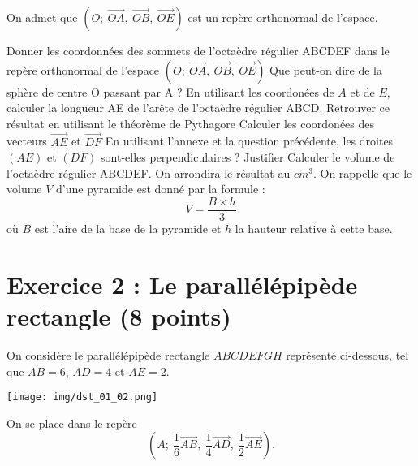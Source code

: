 \documentclass{exam}
\begin{document}
On admet que $\left(O\mathpunct{} ; \ \overrightarrow{OA}\mathpunct{}, \ \overrightarrow{OB}\mathpunct{}, \ \overrightarrow{OE}\right)$ est un repère orthonormal de l'espace.
\begin{questions}
  \question[2.25] Donner les coordonnées des sommets de l'octaèdre régulier ABCDEF dans le repère orthonormal de l'espace $\left(O\mathpunct{} ; \ \overrightarrow{OA}\mathpunct{}, \ \overrightarrow{OB}\mathpunct{}, \ \overrightarrow{OE}\right)$
  \question[1] Que peut-on dire de la sphère de centre O passant par A ?
  \question[1] En utilisant les coordonées de $A$ et de $E$, calculer la longueur AE de l'arête de l'octaèdre régulier ABCD.
  \question[1] Retrouver ce résultat en utilisant le théorème de Pythagore
  \question[1] Calculer les coordonées des vecteurs $\overrightarrow{AE}$ et $\overrightarrow{DF}$
  \question[0.75] En utilisant l'annexe et la question précédente, les droites $(AE)$ et $(DF)$ sont-elles perpendiculaires ? Justifier
  \question[1] Calculer le volume de l'octaèdre régulier ABCDEF. On arrondira le résultat au $cm^3$. On rappelle que le volume $V$ d'une pyramide est donné par la formule :
 \[
  V = \frac{B \times h}{3}
  \]
  où $B$ est l'aire de la base de la pyramide et $h$ la hauteur relative à cette base.
\end{questions} 


\section*{Exercice 2 : Le parallélépipède rectangle (8 points)}

On considère le parallélépipède rectangle $ABCDEFGH$ représenté ci-dessous, tel que $AB = 6$, $AD = 4$ et $AE = 2$.

\begin{center}
    \texttt{[image: img/dst\_01\_02.png]}
\end{center}

On se place dans le repère 
\[
\left(A \mathpunct{}; \ \frac{1}{6} \overrightarrow{AB}\mathpunct{}, \ \frac{1}{4} \overrightarrow{AD}\mathpunct{}, \ \frac{1}{2} \overrightarrow{AE}\right).
\]
\end{document}

